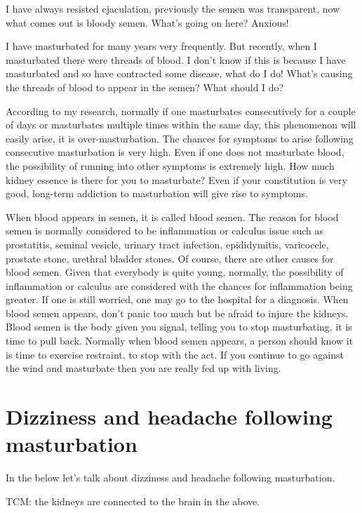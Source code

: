 \documentclass[
]{book}
\begin{document}
I have always resisted ejaculation, previously the semen was transparent, now what comes out is bloody semen. What's going on here? Anxious!

I have masturbated for many years very frequently. But recently, when I masturbated there were threads of blood. I don't know if this is because I have masturbated and so have contracted some disease, what do I do! What's causing the threads of blood to appear in the semen? What should I do?

According to my research, normally if one masturbates consecutively for a couple of days or masturbates multiple times within the same day, this phenomenon will easily arise, it is over-masturbation. The chances for symptoms to arise following consecutive masturbation is very high. Even if one does not masturbate blood, the possibility of running into other symptoms is extremely high. How much kidney essence is there for you to masturbate? Even if your constitution is very good, long-term addiction to masturbation will give rise to symptoms.

When blood appears in semen, it is called blood semen. The reason for blood semen is normally considered to be inflammation or calculus issue such as prostatitis, seminal vesicle, urinary tract infection, epididymitis, varicocele, prostate stone, urethral bladder stones. Of course, there are other causes for blood semen. Given that everybody is quite young, normally, the possibility of inflammation or calculus are considered with the chances for inflammation being greater. If one is still worried, one may go to the hospital for a diagnosis. When blood semen appears, don't panic too much but be afraid to injure the kidneys. Blood semen is the body given you signal, telling you to stop masturbating, it is time to pull back. Normally when blood semen appears, a person should know it is time to exercise restraint, to stop with the act. If you continue to go against the wind and masturbate then you are really fed up with living.

\hypertarget{dizziness-and-headache-following-masturbation}{%
\section{Dizziness and headache following masturbation}\label{dizziness-and-headache-following-masturbation}}

In the below let's talk about dizziness and headache following masturbation.

TCM: the kidneys are connected to the brain in the above.
\end{document}
